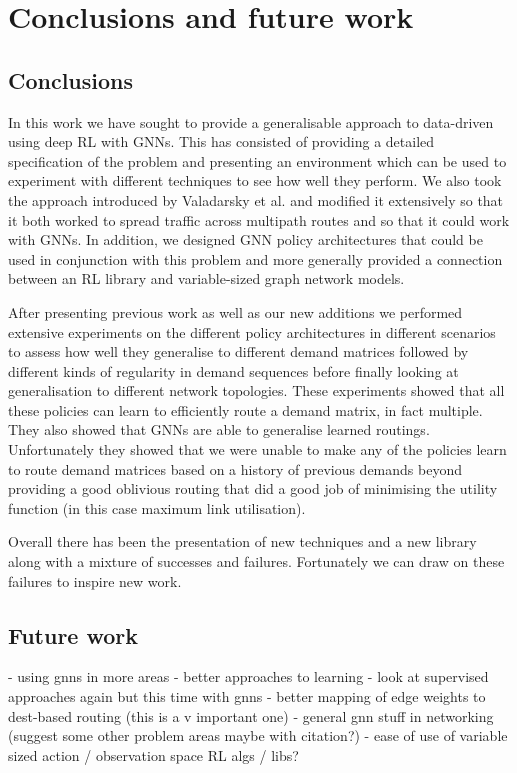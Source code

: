 \chapter{Conclusions and future work}
\label{chapter:conclusions}

\section{Conclusions}
In this work we have sought to provide a generalisable approach to data-driven using deep RL with GNNs. This has consisted of providing a detailed specification of the problem and presenting an environment which can be used to experiment with different techniques to see how well they perform. We also took the approach introduced by Valadarsky et al. and modified it extensively so that it both worked to spread traffic across multipath routes and so that it could work with GNNs. In addition, we designed GNN policy architectures that could be used in conjunction with this problem and more generally provided a connection between an RL library and variable-sized graph network models.

After presenting previous work as well as our new additions we performed extensive experiments on the different policy architectures in different scenarios to assess how well they generalise to different demand matrices followed by different kinds of regularity in demand sequences before finally looking at generalisation to different network topologies. These experiments showed that all these policies can learn to efficiently route a demand matrix, in fact multiple. They also showed that GNNs are able to generalise learned routings. Unfortunately they showed that we were unable to make any of the policies learn to route demand matrices based on a history of previous demands beyond providing a good oblivious routing that did a good job of minimising the utility function (in this case maximum link utilisation).

Overall there has been the presentation of new techniques and a new library along with a mixture of successes and failures. Fortunately we can draw on these failures to inspire new work.


\section{Future work}
- using gnns in more areas
- better approaches to learning
- look at supervised approaches again but this time with gnns
- better mapping of edge weights to dest-based routing (this is a v important one)
- general gnn stuff in networking (suggest some other problem areas maybe with citation?)
- ease of use of variable sized action / observation space RL algs / libs?



